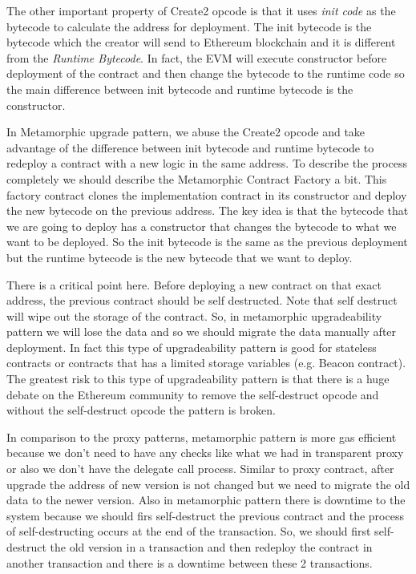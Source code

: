 The other important property of Create2 opcode is that it uses \textit{init code} as the bytecode to calculate the address for deployment. The init bytecode is the bytecode which the creator will send to Ethereum blockchain and it is different from the \textit{Runtime Bytecode}. In fact, the EVM will execute constructor before deployment of the contract and then change the bytecode to the runtime code so the main difference between init bytecode and runtime bytecode is the constructor.

In Metamorphic upgrade pattern, we abuse the Create2 opcode and take advantage of the difference between init bytecode and runtime bytecode to redeploy a contract with a new logic in the same address. To describe the process completely we should describe the Metamorphic Contract Factory a bit. This factory contract clones the implementation contract in its constructor and deploy the new bytecode on the previous address. The key idea is that the bytecode that we are going to deploy has a constructor that changes the bytecode to what we want to be deployed. So the init bytecode is the same as the previous deployment but the runtime bytecode is the new bytecode that we want to deploy.

There is a critical point here. Before deploying a new contract on that exact address, the previous contract should be self destructed. Note that self destruct will wipe out the storage of the contract. So, in metamorphic upgradeability pattern we will lose the data and so we should migrate the data manually after deployment. In fact this type of upgradeability pattern is good for stateless contracts or contracts that has a limited storage variables (e.g. Beacon contract). The greatest risk to this type of upgradeability pattern is that there is a huge debate on the Ethereum community to remove the self-destruct opcode and without the self-destruct opcode the pattern is broken. 

In comparison to the proxy patterns, metamorphic pattern is more gas efficient because we don't need to have any checks like what we had in transparent proxy or also we don't have the delegate call process. Similar to proxy contract, after upgrade the address of new version is not changed but we need to migrate the old data to the newer version. Also in metamorphic pattern there is downtime to the system because we should firs self-destruct the previous contract and the process of self-destructing occurs at the end of the transaction. So, we should first self-destruct the old version in a transaction and then redeploy the contract in another transaction and there is a downtime between these 2 transactions.

